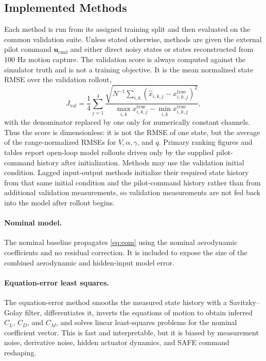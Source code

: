 \documentclass[11pt]{article}
\begin{document}
\subsection*{Implemented Methods}
Each method is run from its assigned training split and then evaluated on the
common validation suite. Unless stated otherwise, methods are given the external
pilot command $\mathbf{u}_{\mathrm{cmd}}$
and either direct noisy states or states reconstructed from 100 Hz motion capture.
The validation score is always computed against the simulator truth and is not a
training objective. It is the mean normalized state RMSE over the validation
rollout,
\[
J_{\mathrm{val}}
=
\frac{1}{4}\sum_{j=1}^{4}
\frac{
\sqrt{N^{-1}\sum_{i,k}
\left(\hat{x}_{i,k,j}-x_{i,k,j}^{\mathrm{true}}\right)^2}
}{
\max_{i,k} x_{i,k,j}^{\mathrm{true}}
-\min_{i,k} x_{i,k,j}^{\mathrm{true}}
},
\]
with the denominator replaced by one only for numerically constant channels.
Thus the score is dimensionless: it is not the RMSE of one state, but the
average of the range-normalized RMSEs for $V,\alpha,\gamma$, and $q$. Primary
ranking figures and tables report open-loop model rollouts driven only by the
supplied pilot-command history after initialization. Methods may use the
validation initial condition. Lagged input-output methods initialize their
required state history from that same initial condition and the pilot-command
history rather than from additional validation measurements, so validation
measurements are not fed back into the model after rollout begins.

\paragraph{Nominal model.}
The nominal baseline propagates \eqref{eq:eom} using the nominal aerodynamic
coefficients and no residual correction. It is included to expose the size of the
combined aerodynamic and hidden-input model error.

\paragraph{Equation-error least squares.}
The equation-error method smooths the measured state history with a
Savitzky--Golay filter, differentiates it, inverts the equations of motion to
obtain inferred $C_L$, $C_D$, and $C_M$, and solves linear least-squares problems
for the nominal coefficient vector. This is fast and interpretable, but it is
biased by measurement noise, derivative noise, hidden actuator dynamics, and
SAFE command reshaping.
\end{document}
